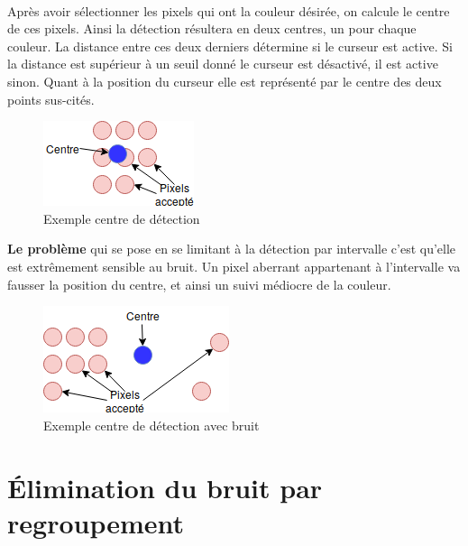 \documentclass[12pt]{report}
\begin{document}
	\paragraph{}Après avoir sélectionner les pixels qui ont la couleur désirée, on calcule le centre de ces pixels. Ainsi la détection résultera en deux centres, un pour chaque couleur. La distance entre ces deux derniers détermine si le curseur est active. Si la distance est supérieur à un seuil donné le curseur est désactivé, il est active sinon. Quant à la position du curseur elle est représenté par le centre des deux points sus-cités.\\
	\begin{figure}[H]
		\centering
		\includegraphics[scale=0.75]{imgs/centerExample.png}
		\caption{Exemple centre de détection}
		\label{fig:CenterCorrect}
	\end{figure}
	\textbf{Le problème} qui se pose en se limitant à la détection par intervalle c’est qu’elle est extrêmement sensible au bruit. Un pixel aberrant appartenant à l’intervalle va fausser la position du centre, et ainsi un suivi médiocre de la couleur.
	\begin{figure}[H]
		\centering
		\includegraphics[scale=0.75]{imgs/centerExampleE.png}
		\caption{Exemple centre de détection avec bruit}
		\label{fig:CenterWrong}
	\end{figure}
	\section{Élimination du bruit par regroupement}
\end{document}
